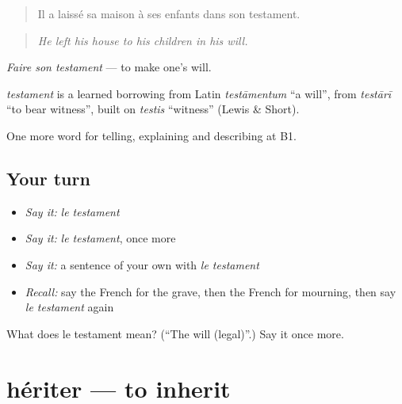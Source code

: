 \begin{quote}
Il a laissé sa maison à ses enfants dans son testament.
\end{quote}

\begin{quote}
\emph{He left his house to his children in his will.}
\end{quote}

\emph{Faire son testament} — to make one's will.

\begin{cousinweb}
\emph{testament} is a learned borrowing from Latin \emph{testāmentum} \textquotedblleft{}a will\textquotedblright{}, from \emph{testārī} \textquotedblleft{}to bear witness\textquotedblright{}, built on \emph{testis} \textquotedblleft{}witness\textquotedblright{} (Lewis \& Short).
\end{cousinweb}

\begin{grammarlens}[title={What you've built}]
One more word for telling, explaining and describing at B1.
\end{grammarlens}

\subsection*{Your turn}
\begin{itemize}
\raggedright
  \item \emph{Say it:} \emph{le testament}
  \item \emph{Say it:} \emph{le testament}, once more
  \item \emph{Say it:} a sentence of your own with \emph{le testament}
  \item \emph{Recall:} say the French for the grave, then the French for mourning, then say \emph{le testament} again
\end{itemize}

\begin{tcolorbox}[breakable,colback=teal!4,colframe=teal!35!black,title={Before you move on}]
What does le testament mean? (\textquotedblleft{}The will (legal)\textquotedblright{}.) Say it once more.
\end{tcolorbox}
\section[hériter]{hériter — to inherit}

\label{lesson:FR-C315-heriter}



